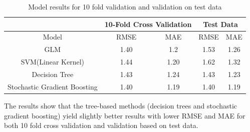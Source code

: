 \documentclass[12pt,english]{report}
\begin{document}
\begin{table}[H]
\centering
\caption{Model results for 10 fold validation and validation on test data}
\label{num_year}
\begin{tabular}{|c|c|c|c|c|} \hline
                             & \multicolumn{2}{c|}{10-Fold Cross Validation} &
\multicolumn{2}{c|}{Test Data} \\ \hline
Model                        & RMSE                  & MAE                   & RMSE           & MAE           \\ \hline
GLM                          & 1.40                  & 1.2                   & 1.53           & 1.26          \\ \hline
SVM(Linear Kernel)           & 1.44                  & 1.20                  & 1.62           & 1.32          \\ \hline
Decision Tree                         & 1.43                  & 1.24        & 1.43           & 1.23          \\ \hline
Stochastic Gradient Boosting & 1.40                  & 1.19                  & 1.40           & 1.19           \\ \hline
\end{tabular}
\end{table}

The results show that the tree-based methods (decision trees and stochastic gradient boosting) yield slightly better results with lower RMSE and MAE for both 10 fold cross validation and validation based on test data.
\end{document}
